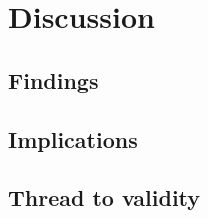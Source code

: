 \chapter{Discussion}
    \section{Findings}

    \section{Implications}
    
    \section{Thread to validity}
